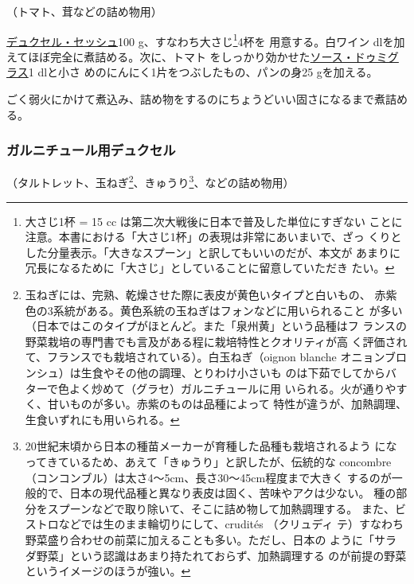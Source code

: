 \begin{recette}
（トマト、茸などの詰め物用）

\protect\hyperlink{duxelles-seche}{デュクセル・セッシュ}100
g、すなわち大さじ\footnote{大さじ1杯 = 15 cc
  は第二次大戦後に日本で普及した単位にすぎない
  ことに注意。本書における「大さじ1杯」の表現は非常にあいまいで、ざっ
  くりとした分量表示。「大きなスプーン」と訳してもいいのだが、本文が
  あまりに冗長になるために「大さじ」としていることに留意していただき
  たい。}4杯を 用意する。白ワイン\undemi{}
dlを加えてほぼ完全に煮詰める。次に、トマト
をしっかり効かせた\protect\hyperlink{sauce-demi-glace}{ソース・ドゥミグラス}1
dlと小さ めのにんにく1片をつぶしたもの、パンの身25 gを加える。

ごく弱火にかけて煮込み、詰め物をするのにちょうどいい固さになるまで煮詰める。

\maeaki

\hypertarget{duxelles-pour-farnitures-diverses}{%
\subsubsection{ガルニチュール用デュクセル}\label{duxelles-pour-farnitures-diverses}}



（タルトレット、玉ねぎ\footnote{玉ねぎには、完熟、乾燥させた際に表皮が黄色いタイプと白いもの、
  赤紫色の3系統がある。黄色系統の玉ねぎはフォンなどに用いられること
  が多い（日本ではこのタイプがほとんど。また「泉州黄」という品種はフ
  ランスの野菜栽培の専門書でも言及がある程に栽培特性とクオリティが高
  く評価されて、フランスでも栽培されている）。白玉ねぎ（oignon blanche
  オニョンブロンシュ）は生食やその他の調理、とりわけ小さいも
  のは下茹でしてからバターで色よく炒めて（グラセ）ガルニチュールに用
  いられる。火が通りやすく、甘いものが多い。赤紫のものは品種によって
  特性が違うが、加熱調理、生食いずれにも用いられる。}、きゅうり\footnote{20世紀末頃から日本の種苗メーカーが育種した品種も栽培されるよう
  になってきているため、あえて「きゅうり」と訳したが、伝統的な concombre
  （コンコンブル）は太さ4〜5cm、長さ30〜45cm程度まで大きく
  するのが一般的で、日本の現代品種と異なり表皮は固く、苦味やアクは少ない。
  種の部分をスプーンなどで取り除いて、そこに詰め物して加熱調理する。
  また、ビストロなどでは生のまま輪切りにして、crudités （クリュディ
  テ）すなわち野菜盛り合わせの前菜に加えることも多い。ただし、日本の
  ように「サラダ野菜」という認識はあまり持たれておらず、加熱調理する
  のが前提の野菜というイメージのほうが強い。}、などの詰め物用）


\end{recette}

